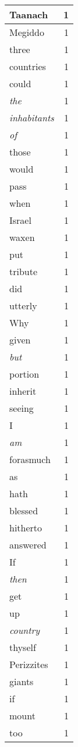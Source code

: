 \begin{center}
\begin{longtable}{l|r}
Taanach & 1 \\ \hline
Megiddo & 1 \\ \hline
three & 1 \\ \hline
countries & 1 \\ \hline
could & 1 \\ \hline
\emph{the} & 1 \\ \hline
\emph{inhabitants} & 1 \\ \hline
\emph{of} & 1 \\ \hline
those & 1 \\ \hline
would & 1 \\ \hline
pass & 1 \\ \hline
when & 1 \\ \hline
Israel & 1 \\ \hline
waxen & 1 \\ \hline
put & 1 \\ \hline
tribute & 1 \\ \hline
did & 1 \\ \hline
utterly & 1 \\ \hline
Why & 1 \\ \hline
given & 1 \\ \hline
\emph{but} & 1 \\ \hline
portion & 1 \\ \hline
inherit & 1 \\ \hline
seeing & 1 \\ \hline
I & 1 \\ \hline
\emph{am} & 1 \\ \hline
forasmuch & 1 \\ \hline
as & 1 \\ \hline
hath & 1 \\ \hline
blessed & 1 \\ \hline
hitherto & 1 \\ \hline
answered & 1 \\ \hline
If & 1 \\ \hline
\emph{then} & 1 \\ \hline
get & 1 \\ \hline
up & 1 \\ \hline
\emph{country} & 1 \\ \hline
thyself & 1 \\ \hline
Perizzites & 1 \\ \hline
giants & 1 \\ \hline
if & 1 \\ \hline
mount & 1 \\ \hline
too & 1 \\ \hline

\end{longtable}
\end{center}

